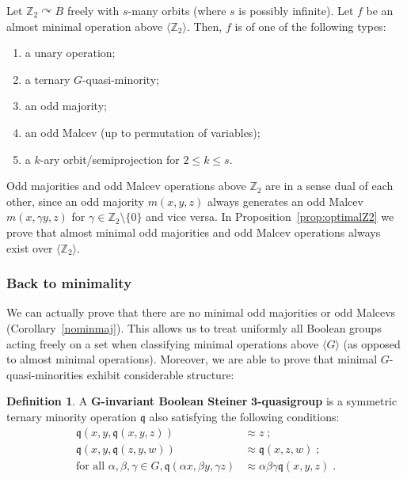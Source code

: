 \documentclass{article}
\newenvironment{customthm}[1]
  {\renewcommand\theinnercustomthm{#1}\innercustomthm}
  {\endinnercustomthm}
\theoremstyle{remark}
\theoremstyle{definition}
\newtheorem{definition}[theorem]{Definition}
\def\acts{\curvearrowright}
\begin{document}
\begin{customthm}{E}[Theorem~\ref{Z2case}, $\mathbb{Z}_2 $ case]\label{thme} Let $\mathbb{Z}_2\acts B$ freely with $s$-many orbits (where $s$ is possibly infinite). Let $f$ be an almost minimal operation above ${\langle \mathbb{Z}_2 \rangle}$. Then,  $f$ is of one of the following types:
\begin{enumerate}
    \item a unary operation;
    \item a ternary $G$-quasi-minority;
    \item an odd majority;
    \item an odd Malcev (up to permutation of variables);
    \item a $k$-ary orbit\-/semiprojection for $2\leq k \leq s$.
\end{enumerate} 
\end{customthm}
Odd majorities and odd Malcev operations above $\mathbb{Z}_2$ are in a sense dual of each other, since an odd majority $m(x,y,z)$ always generates an odd Malcev $m(x,\gamma y, z)$ for  $\gamma\in\mathbb{Z}_2\setminus \{0\}$ and vice versa. In Proposition~\ref{prop:optimalZ2} we prove that almost minimal odd majorities and odd Malcev operations always exist over $\langle \mathbb{Z}_2\rangle$.



\subsubsection{Back to minimality}

We can actually prove that there are no minimal odd majorities or odd Malcevs (Corollary~\ref{nominmaj}). This allows us to treat uniformly all Boolean groups acting freely on a set when classifying minimal operations above $\langle G\rangle$ (as opposed to almost minimal operations). Moreover, we are able to prove that minimal $G$-quasi-minorities exhibit considerable structure:

\begin{definition}\label{def:boolgtwisted} A $\bm{G}$\textbf{-invariant Boolean Steiner }$\bm{3}$\textbf{-quasigroup} is a symmetric ternary minority operation $\mathfrak{q}$ also satisfying the following conditions:
\begin{align}
    \mathfrak{q}(x, y, \mathfrak{q}(x,y,z))&\approx z\; ; \tag{SQS} \label{eq:sqslaw}\\
    \mathfrak{q}(x, y, \mathfrak{q}(z, y, w))&\approx \mathfrak{q}(x, z, w) \; ; \tag{Bool} \label{boolaw}\\
    \text{for all }\alpha, \beta, \gamma\in G, \mathfrak{q}(\alpha x, \beta y, \gamma z)&\approx \alpha\beta\gamma \mathfrak{q}(x, y, z) \;. \tag{Inv} \label{eq:twistid}
\end{align}
\end{definition}
\end{document}
